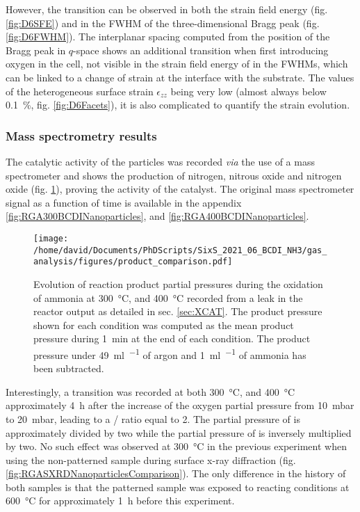 However, the transition can be observed in both the strain field energy (fig. \ref{fig:D6SFE}) and in the FWHM of the three-dimensional Bragg peak (fig. \ref{fig:D6FWHM}).
The interplanar spacing computed from the position of the Bragg peak in $q$-space shows an additional transition when first introducing oxygen in the cell, not visible in the strain field energy of in the FWHMs, which can be linked to a change of strain at the interface with the substrate.
The values of the heterogeneous surface strain $\epsilon_{zz}$ being very low (almost always below \qty{0.1}{\percent}, fig. \ref{fig:D6Facets}), it is also complicated to quantify the strain evolution.

\subsubsection{Mass spectrometry results}

The catalytic activity of the particles was recorded \textit{via} the use of a mass spectrometer and shows the production of nitrogen, nitrous oxide and nitrogen oxide (fig. \ref{fig:RGANanoparticlesBCDIComparison}), proving the activity of the catalyst.
The original mass spectrometer signal as a function of time is available in the appendix \ref{fig:RGA300BCDINanoparticles}, and \ref{fig:RGA400BCDINanoparticles}.

\begin{figure}[!htb]
    \centering
    \texttt{[image: /home/david/Documents/PhDScripts/SixS\_2021\_06\_BCDI\_NH3/gas\_analysis/figures/product\_comparison.pdf]}
    \caption{
        Evolution of reaction product partial pressures during the oxidation of ammonia at \qty{300}{\degreeCelsius}, and \qty{400}{\degreeCelsius} recorded from a leak in the reactor output as detailed in sec. \ref{sec:XCAT}.
        The product pressure shown for each condition was computed as the mean product pressure during \qty{1}{\minute} at the end of each condition.
        The product pressure under \qty{49}{\ml\per\min} of argon and \qty{1}{\ml\per\min} of ammonia has been subtracted.
    }
    \label{fig:RGANanoparticlesBCDIComparison}
\end{figure}

Interestingly, a transition was recorded at both \qty{300}{\degreeCelsius}, and \qty{400}{\degreeCelsius} approximately \qty{4}{\hour} after the increase of the oxygen partial pressure from \qty{10}{\milli\bar} to \qty{20}{\milli\bar}, leading to a / ratio equal to 2.
The partial pressure of  is approximately divided by two while the partial pressure of  is inversely multiplied by two.
No such effect was observed at \qty{300}{\degreeCelsius} in the previous experiment when using the non-patterned sample during surface x-ray diffraction (fig. \ref{fig:RGASXRDNanoparticlesComparison}).
The only difference in the history of both samples is that the patterned sample was exposed to reacting conditions at \qty{600}{\degreeCelsius} for approximately \qty{1}{\hour} before this experiment.

